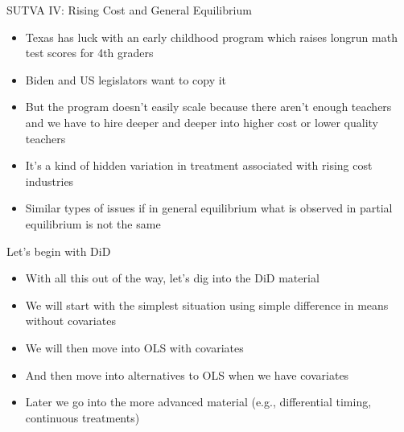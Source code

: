 \documentclass{beamer}
\begin{document}
\begin{frame}{SUTVA IV: Rising Cost and General Equilibrium}

\begin{itemize}

\item Texas has luck with an early childhood program which raises longrun math test scores for 4th graders
\item Biden and US legislators want to copy it
\item But the program doesn't easily scale because there aren't enough teachers and we have to hire deeper and deeper into higher cost or lower quality teachers
\item It's a kind of hidden variation in treatment associated with rising cost industries
\item Similar types of issues if in general equilibrium what is observed in partial equilibrium is not the same
\end{itemize}

\end{frame}

\begin{frame}{Let's begin with DiD}

\begin{itemize}
\item With all this out of the way, let's dig into the DiD material
\item We will start with the simplest situation using simple difference in means without covariates
\item We will then move into OLS with covariates
\item And then move into alternatives to OLS when we have covariates
\item Later we go into the more advanced material (e.g., differential timing, continuous treatments)
\end{itemize}

\end{frame}
\end{document}
